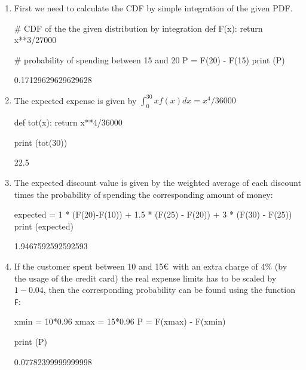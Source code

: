 \cprotEnv\begin{solution}
\begin{enumerate}[label={\emph{\alph*})}]
\item First we need to calculate the CDF by simple integration of the given PDF.
\begin{ipython}
# CDF of the the given distribution by integration
def F(x):
    return x**3/27000

# probability of spending between 15 and 20
P = F(20) - F(15)
print (P)
\end{ipython}
\begin{ioutput}
0.17129629629629628
\end{ioutput}
\item The expected expense is given by $\int_{0}^{30} xf(x) dx = x^4/36000$
\begin{ipython}
def tot(x):
    return x**4/36000

print (tot(30))
\end{ipython}
\begin{ioutput}
22.5	
\end{ioutput}

\item The expected discount value is given by the weighted average of each discount times the probability of spending the corresponding amount of money:
\begin{ipython}
expected = 1 * (F(20)-F(10)) + 1.5 * (F(25) - F(20)) + 3 * (F(30) - F(25))
print (expected)
\end{ipython}
\begin{ioutput}
1.9467592592592593
\end{ioutput}

\item If the customer spent between 10 and 15\euro~with an extra charge of 4\% (by the usage of the credit card) the real expense limits has to be scaled by $1 - 0.04$, then the corresponding probability can be found using the function \texttt{F}:
\begin{ipython}
xmin = 10*0.96
xmax = 15*0.96
P = F(xmax) - F(xmin)

print (P)
\end{ipython}
\begin{ioutput}
0.07782399999999998
\end{ioutput}
\end{enumerate}
\end{solution}

